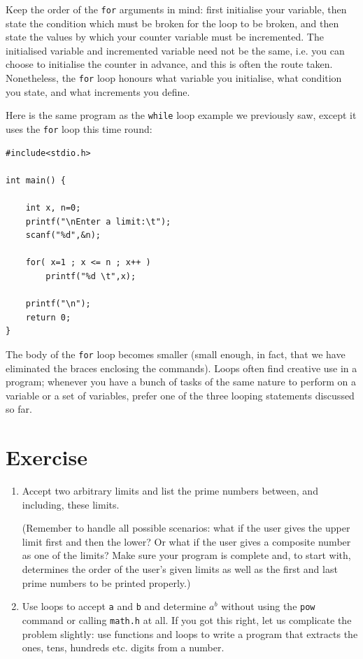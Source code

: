 \documentclass[11pt,oneside]{article}
\newcounter{exercise}
\begin{document}
{{{{{{{{{Keep the order of the \verb+for+ arguments in mind: first initialise your variable, then state the condition which must be broken for the loop to be broken, and then state the values by which your counter variable must be incremented. The initialised variable and incremented variable need not be the same, i.e. you can choose to initialise the counter in advance, and this is often the route taken. Nonetheless, the \verb+for+ loop honours what variable you initialise, what condition you state, and what increments you define.

Here is the same program as the \verb+while+ loop example we previously saw, except it uses the \verb+for+ loop this time round:\\[-1cm]
\begin{lstlisting}
#include<stdio.h>

int main() {

    int x, n=0;
    printf("\nEnter a limit:\t");
    scanf("%d",&n);
    
    for( x=1 ; x <= n ; x++ )
        printf("%d \t",x);
    
    printf("\n");
    return 0;
}
\end{lstlisting}

The body of the \verb+for+ loop becomes smaller (small enough, in fact, that we have eliminated the braces enclosing the commands). Loops often find creative use in a program; whenever you have a bunch of tasks of the same nature to perform on a variable or a set of variables, prefer one of the three looping statements discussed so far.

\section*{Exercise \theexercise}\label{ex:if}
\begin{enumerate}[label=\arabic*.]
\item Accept two arbitrary limits and list the prime numbers between, and including, these limits.

(Remember to handle all possible scenarios: what if the user gives the upper limit first and then the lower? Or what if the user gives a composite number as one of the limits? Make sure your program is complete and, to start with, determines the order of the user's given limits as well as the first and last prime numbers to be printed properly.)

\item Use loops to accept \verb+a+ and \verb+b+ and determine $a^b$ without using the \verb+pow+ command or calling \verb+math.h+ at all. If you got this right, let us complicate the problem slightly: use functions and loops to write a program that extracts the ones, tens, hundreds etc. digits from a number.


\end{enumerate}}}}}}}}}}
\end{document}

